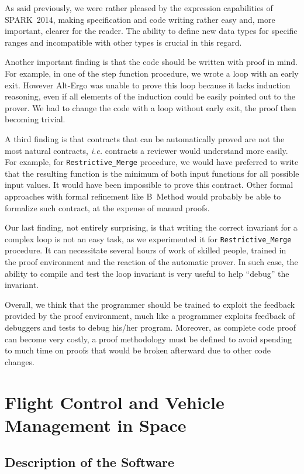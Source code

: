 \documentclass[10pt,a4paper,twocolumn]{article}
\newcommand{\newspark}{SPARK~2014\xspace}
\newcommand{\altergo}{Alt-Ergo\xspace}
\newcommand{\ie}{\textit{i.e.}\xspace}
\newcommand{\SPARK}[1]{\lstinline[language=Ada,basicstyle={\footnotesize
      \sffamily},framesep=0pt]$#1$}
\begin{document}
As said previously, we were rather pleased by the expression
capabilities of \newspark, making specification and code writing
rather easy and, more important, clearer for the reader. The ability
to define new data types for specific ranges and incompatible with
other types is crucial in this regard.

Another important finding is that the code should be written with
proof in mind. For example, in one of the step function procedure, we
wrote a loop with an early exit. However \altergo was unable to prove
this loop because it lacks induction reasoning, even if all elements
of the induction could be easily pointed out to the prover. We had to
change the code with a loop without early exit, the proof then
becoming trivial.

A third finding is that contracts that can be automatically proved are
not the most natural contracts, \ie contracts a reviewer would
understand more easily. For example, for \SPARK{Restrictive_Merge}
procedure, we would have preferred to write that the resulting function
is the minimum of both input functions for all possible input
values. It would have been impossible to prove this contract. Other
formal approaches with formal refinement like B~Method would probably
be able to formalize such contract, at the expense of manual proofs.

Our last finding, not entirely surprising, is that writing the correct
invariant for a complex loop is not an easy task, as we experimented
it for \SPARK{Restrictive_Merge} procedure. It can necessitate several
hours of work of skilled people, trained in the proof environment and
the reaction of the automatic prover. In such case, the ability to
compile and test the loop invariant is very useful to help ``debug''
the invariant.

Overall, we think that the programmer should be trained to exploit the
feedback provided by the proof environment, much like a programmer
exploits feedback of debuggers and tests to debug his/her program.
Moreover, as complete code proof can become very costly, a proof
methodology must be defined to avoid spending to much time on proofs
that would be broken afterward due to other code changes.

\section{Flight Control and Vehicle Management in Space}

\subsection{Description of the Software}
\end{document}
